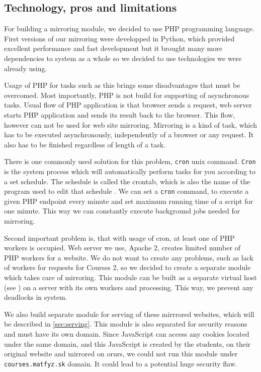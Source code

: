 \subsection{Technology, pros and limitations}
\label{sec:technology}
For building a mirroring module, we decided to use PHP programming language. First versions of our mirroring were developped in Python, which provided excellent performance and fast development but it brought many more dependencies to system as a whole so we decided to use technologies we were already using. 

Usage of PHP for tasks such as this brings some disadvantages that must be overcomed. Most importantly, PHP is not build for supporting of asynchronous tasks. Usual flow of PHP application is that browser sends a request, web server starts PHP application and sends its result back to the browser. This flow, however can not be used for web site mirroring. Mirroring is a kind of task, which has to be executed asynchronously, independently of a browser or any request. It also has to be finished regardless of length of a task.

There is one commonly used solution for this problem, \texttt{cron} unix command. \texttt{Cron} is the system process which will automatically perform tasks for you according to a set schedule. The schedule is called the crontab, which is also the name of the program used to edit that schedule \cite{crontab}. We can set a \texttt{cron} command, to execute a given PHP endpoint every minute and set maximum running time of a script for one minute. This way we can constantly execute background jobs needed for mirroring.

Second important problem is, that with usage of cron, at least one of PHP workers is occupied. Web server we use, Apache 2, creates limited number of PHP workers for a website. We do not want to create any problems, such as lack of workers for requests for Courses 2, so we decided to create a separate module which takes care of mirroring. This module can be built as a separate virtual host (see \cite{apachepocket}) on a server with its own workers and processing. This way, we prevent any deadlocks in system.

We also build separate module for serving of these mirrrored websites, which will be described in \ref{sec:serving}. This module is also separated for security reasons and must have its own domain. Since JavaScript can access any cookies located under the same domain, and this JavaScript is created by the students, on their original website and mirrored on orurs, we could not run this module under \texttt{courses.matfyz.sk} domain. It could lead to a potential huge security flaw.

